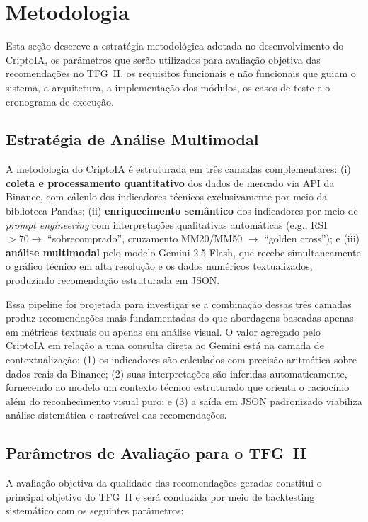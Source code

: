 \documentclass[conference]{IEEEtran}
\begin{document}
\section{Metodologia}
\label{sec:metodologia}

Esta seção descreve a estratégia metodológica adotada no desenvolvimento do CriptoIA, os parâmetros que serão utilizados para avaliação objetiva das recomendações no TFG~II, os requisitos funcionais e não funcionais que guiam o sistema, a arquitetura, a implementação dos módulos, os casos de teste e o cronograma de execução.

\subsection{Estratégia de Análise Multimodal}

A metodologia do CriptoIA é estruturada em três camadas complementares: (i) \textbf{coleta e processamento quantitativo} dos dados de mercado via API da Binance, com cálculo dos indicadores técnicos exclusivamente por meio da biblioteca Pandas; (ii) \textbf{enriquecimento semântico} dos indicadores por meio de \textit{prompt engineering} com interpretações qualitativas automáticas (e.g., RSI $> 70 \rightarrow$ ``sobrecomprado'', cruzamento MM20/MM50 $\rightarrow$ ``golden cross''); e (iii) \textbf{análise multimodal} pelo modelo Gemini 2.5 Flash, que recebe simultaneamente o gráfico técnico em alta resolução e os dados numéricos textualizados, produzindo recomendação estruturada em JSON.

Essa pipeline foi projetada para investigar se a combinação dessas três camadas produz recomendações mais fundamentadas do que abordagens baseadas apenas em métricas textuais ou apenas em análise visual. O valor agregado pelo CriptoIA em relação a uma consulta direta ao Gemini está na camada de contextualização: (1) os indicadores são calculados com precisão aritmética sobre dados reais da Binance; (2) suas interpretações são inferidas automaticamente, fornecendo ao modelo um contexto técnico estruturado que orienta o raciocínio além do reconhecimento visual puro; e (3) a saída em JSON padronizado viabiliza análise sistemática e rastreável das recomendações.

\subsection{Parâmetros de Avaliação para o TFG~II}

A avaliação objetiva da qualidade das recomendações geradas constitui o principal objetivo do TFG~II e será conduzida por meio de backtesting sistemático com os seguintes parâmetros:
\end{document}
